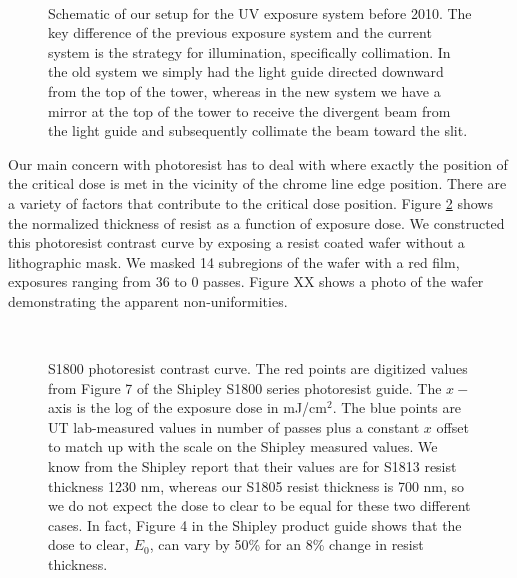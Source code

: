 \begin{figure}[h!] 
\begin{center}
\ 
\caption[Schematic of our former UV exposure system]{Schematic of our setup for the UV exposure system before 2010.  The key difference of the previous exposure system and the current system is the strategy for illumination, specifically collimation.  In the old system we simply had the light guide directed downward from the top of the tower, whereas in the new system we have a mirror at the top of the tower to receive the divergent beam from the light guide and subsequently collimate the beam toward the slit.}
\label{fig:uvsys}
\end{center}
\end{figure}

Our main concern with photoresist has to deal with where exactly the position of the critical dose is met in the vicinity of the chrome line edge position.  There are a variety of factors that contribute to the critical dose position.  Figure \ref{fig:dose2clear} shows the normalized thickness of resist as a function of exposure dose.  We constructed this photoresist contrast curve by exposing a resist coated wafer without a lithographic mask.  We masked 14 subregions of the wafer with a red film, exposures ranging from 36 to 0 passes.  Figure XX shows a photo of the wafer demonstrating the apparent non-uniformities.

\begin{figure}[h!] 
\begin{center}
\ 
\caption[S1800 photoresist contrast curve]{S1800 photoresist contrast curve.  The red points are digitized values from Figure 7 of the Shipley S1800 series photoresist guide.  The $x-$ axis is the log of the exposure dose in mJ/cm$^2$.  The blue points are UT lab-measured values in number of passes plus a constant $x$ offset to match up with the scale on the Shipley measured values.  We know from the Shipley report that their values are for S1813 resist thickness 1230 nm, whereas our S1805 resist thickness is 700 nm, so we do not expect the dose to clear to be equal for these two different cases.  In fact, Figure 4 in the Shipley product guide shows that the dose to clear, $E_0$, can vary by 50\% for an 8\% change in resist thickness.}
\label{fig:dose2clear}
\end{center}
\end{figure}


